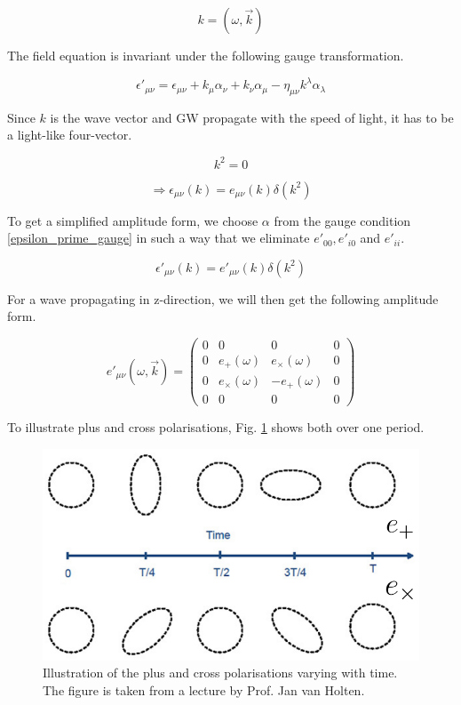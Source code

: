 \begin{equation}
    k=(\omega, \vec{k})
\end{equation}

The field equation is invariant under the following gauge transformation. 

\begin{equation}
    \epsilon '_{\mu\nu}=\epsilon_{\mu\nu}+k_\mu \alpha_\nu + k_\nu \alpha_\mu - \eta_{\mu\nu}k^\lambda \alpha_\lambda
    \label{epsilon_prime_gauge}
\end{equation}

Since $k$ is the wave vector and GW propagate with the speed of light, it has to be a light-like four-vector.

\begin{equation}
    k^2=0
\end{equation}

\begin{equation}
    \Rightarrow \epsilon_{\mu\nu}(k) = e_{\mu\nu} (k)\delta(k^2)
\end{equation}

To get a simplified amplitude form, we choose $\alpha$ from the gauge condition \ref{epsilon_prime_gauge} in such a way that we eliminate $e'_{00}, e'_{i0}$ and $e'_{ii}$. 

\begin{equation}
    \epsilon '_{\mu\nu}(k) = e'_{\mu\nu} (k)\delta(k^2) 
\end{equation}

For a wave propagating in z-direction, we will then get the following amplitude form.

\begin{equation}
    e'_{\mu\nu}(\omega, \vec{k})=
    \begin{pmatrix}
        0 & 0 & 0 & 0 \\
        0 & e_+(\omega) & e_\times(\omega) & 0 \\ 
        0 & e_\times(\omega) & -e_+(\omega) & 0 \\
        0 & 0 & 0 & 0
    \end{pmatrix}
\end{equation}

To illustrate plus and cross polarisations, Fig. \ref{polarisation} shows both over one period.

\begin{figure}[h]
    \centering
    \includegraphics[width=0.4\linewidth]{Images/polarisations.png}
    \caption{Illustration of the plus and cross polarisations varying with time. The figure is taken from a lecture by Prof. Jan van Holten.}
    \label{polarisation}
\end{figure} 


